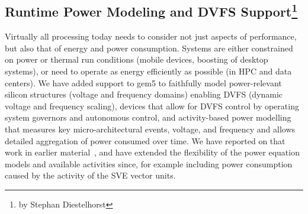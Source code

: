 \subsection[Runtime Power Modeling and DVFS Support]{Runtime Power Modeling and DVFS Support\footnote{by Stephan Diestelhorst}}

Virtually all processing today needs to consider not just aspects of performance, but also that of energy and power consumption. Systems are either constrained on power or thermal run conditions (mobile devices, boosting of desktop systems), or need to operate as energy efficiently as possible (in HPC and data centers).
We have added support to gem5 to faithfully model power-relevant silicon structures (voltage and frequency domains) enabling DVFS (dynamic voltage and frequency scaling), devices that allow for DVFS control by operating system governors and autonomous control, and activity-based power modelling that measures key micro-architectural events, voltage, and frequency and allows detailed aggregation of power consumed over time.
We have reported on that work in earlier material~\cite{SpiliopoulosBHAK13}, and have extended the flexibility of the power equation models and available activities since, for example including power consumption caused by the activity of the SVE vector units.
